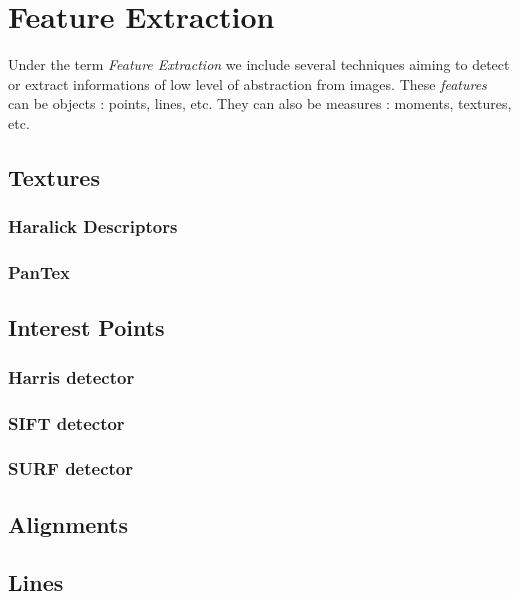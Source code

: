 \chapter{Feature Extraction}


Under the term {\em Feature Extraction} we include several techniques
aiming to detect or extract informations of low level of abstraction
from images. These {\em features} can be objects : points, lines,
etc. They can also be measures : moments, textures, etc.

\section{Textures}
\subsection{Haralick Descriptors}

\subsection{PanTex}


\section{Interest Points}
\subsection{Harris detector}

\subsection{SIFT detector}
\label{sec:SIFTDetector}

\subsection{SURF detector}


\section{Alignments}
\label{sec:Alignments}

\section{Lines}
\label{sec:LineDetectors}


